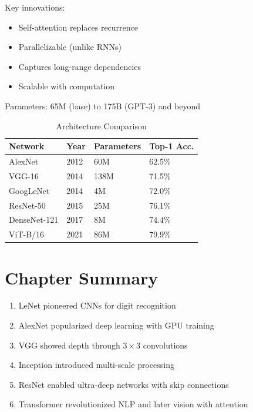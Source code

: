 Key innovations:
\begin{itemize}
    \item Self-attention replaces recurrence
    \item Parallelizable (unlike RNNs)
    \item Captures long-range dependencies
    \item Scalable with computation
\end{itemize}

Parameters: 65M (base) to 175B (GPT-3) and beyond

\begin{table}[h]
    \centering
    \caption{Architecture Comparison}
    \begin{tabular}{L{2.5cm} L{2cm} L{2.5cm} L{2.5cm}}
        \toprule
        \textbf{Network} & \textbf{Year} & \textbf{Parameters} & \textbf{Top-1 Acc.} \\
        \midrule
        AlexNet & 2012 & 60M & 62.5\% \\
        VGG-16 & 2014 & 138M & 71.5\% \\
        GoogLeNet & 2014 & 4M & 72.0\% \\
        ResNet-50 & 2015 & 25M & 76.1\% \\
        DenseNet-121 & 2017 & 8M & 74.4\% \\
        ViT-B/16 & 2021 & 86M & 79.9\% \\
        \bottomrule
    \end{tabular}
\end{table}

\section{Chapter Summary}

\begin{enumerate}
    \item LeNet pioneered CNNs for digit recognition
    \item AlexNet popularized deep learning with GPU training
    \item VGG showed depth through $3\times3$ convolutions
    \item Inception introduced multi-scale processing
    \item ResNet enabled ultra-deep networks with skip connections
    \item Transformer revolutionized NLP and later vision with attention
\end{enumerate}
